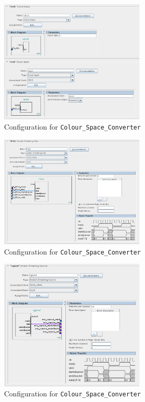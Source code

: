 \documentclass{capstonedoc}
\begin{document}
\begin{figure}[ht]
  \centering
  \includegraphics[width=7cm]{qsys_i_1}
  \caption{Configuration for \texttt{Colour\_Space\_Converter}}
  \label{fig:qsysvidfbcfg}
\end{figure}

\begin{figure}[ht]
  \centering
  \includegraphics[width=7cm]{qsys_i_2}
  \caption{Configuration for \texttt{Colour\_Space\_Converter}}
  \label{fig:qsysvidfbcfg}
\end{figure}

\begin{figure}[ht]
  \centering
  \includegraphics[width=7cm]{qsys_i_3}
  \caption{Configuration for \texttt{Colour\_Space\_Converter}}
  \label{fig:qsysvidfbcfg}
\end{figure}
\end{document}

